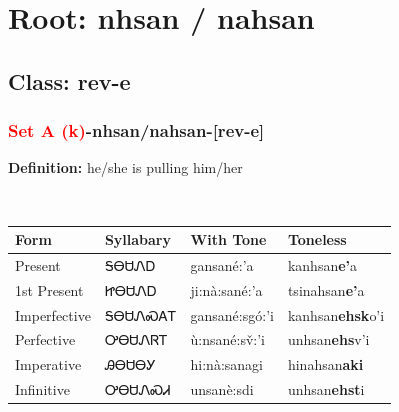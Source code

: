 \needspace{4in}
\section*{Root: nhsan / nahsan}
\nopagebreak
{}
\needspace{3in}
\subsection*{Class: rev-e}
\nopagebreak
\needspace{2in}
\subsubsection*{\textcolor{Red}{Set A (k)}{-}\textbf{nhsan/nahsan}{-}[rev-e]}
\nopagebreak
\textbf{Definition: } he/she is pulling him/her
\\[0.5em]
\begin{tabularx}{\textwidth}{l X X X}%
\toprule%
\textbf{Form}&\textbf{Syllabary}&\textbf{With Tone}&\textbf{Toneless}\\%
\midrule%
Present&ᎦᎾᏌᏁᎠ&gansané:’a&kanhsan\textbf{e'}a\\%
1st Present&ᏥᎾᏌᏁᎠ&ji:nà:sané:’a&tsinahsan\textbf{e'}a\\%
Imperfective&ᎦᎾᏌᏁᏍᎪᎢ&gansané:sgó:’i&kanhsan\textbf{ehsk}o'i\\%
Perfective&ᎤᎾᏌᏁᏒᎢ&ù:nsané:sv̌:’i&unhsan\textbf{ehs}v'i\\%
Imperative&ᎯᎾᏌᎾᎩ&hi:nà:sanagi&hinahsan\textbf{aki}\\%
Infinitive&ᎤᎾᏌᏁᏍᏗ&unsanè:sdi&unhsan\textbf{ehst}i\\%
\bottomrule%
\end{tabularx}
\\[1em]